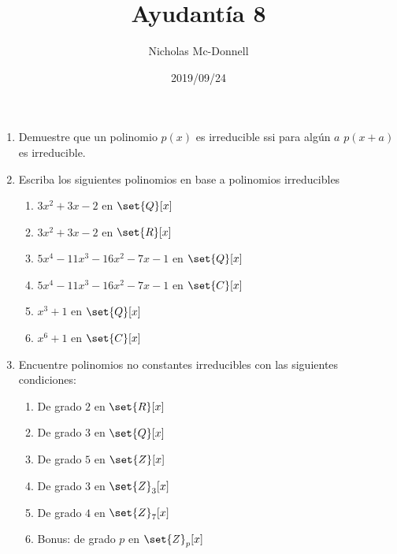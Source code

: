 \documentclass{ayudantia}
\title{Ayudantía 8}
\date{2019/09/24}
\author{Nicholas Mc-Donnell}
\begin{document}
\maketitle
\begin{enumerate}
    \item Demuestre que un polinomio \(p(x)\) es irreducible ssi para algún \(a\) \(p(x+a)\) es irreducible.
    \item Escriba los siguientes polinomios en base a polinomios irreducibles
          \begin{enumerate}[label=(\alph*)]
              \item \(3x^2+3x-2\) en \(\set{Q}[x]\)
              \item \(3x^2+3x-2\) en \(\set{R}[x]\)
              \item \(5 x^4 - 11 x^3 - 16 x^2 - 7 x - 1\) en \(\set{Q}[x]\)
              \item \(5 x^4 - 11 x^3 - 16 x^2 - 7 x - 1\) en \(\set{C}[x]\)
              \item \(x^3+1\) en \(\set{Q}[x]\)
              \item \(x^6+1\) en \(\set{C}[x]\)
          \end{enumerate}
    \item Encuentre polinomios no constantes irreducibles con las siguientes condiciones:
    \begin{enumerate}
        \item De grado \(2\) en \(\set{R}[x]\)
        \item De grado \(3\) en \(\set{Q}[x]\)
        \item De grado \(5\) en \(\set{Z}[x]\)
        \item De grado \(3\) en \(\set{Z}_3[x]\)
        \item De grado \(4\) en \(\set{Z}_7[x]\)
        \item Bonus: de grado \(p\) en \(\set{Z}_p[x]\)
    \end{enumerate}
\end{enumerate}
\end{document}
